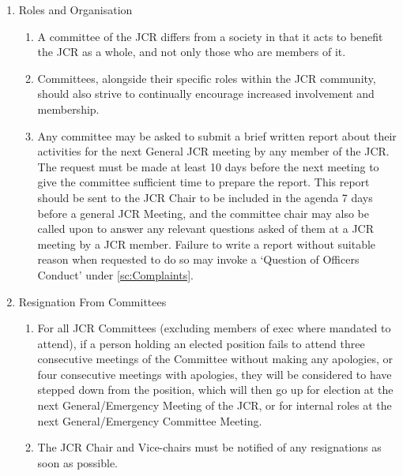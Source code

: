 \begin{enumerate}
    \item Roles and Organisation
    \begin{enumerate}
        \item A committee of the JCR differs from a society in that it acts to benefit the JCR as a whole, and not only those who are members of it.
        \item Committees, alongside their specific roles within the JCR community, should also strive to continually encourage increased involvement and membership.
        \item Any committee may be asked to submit a brief written report about their activities for the next General JCR meeting by any member of the JCR. The request must be made at least 10 days before the next meeting to give the committee sufficient time to prepare the report. This report should be sent to the JCR Chair to be included in the agenda 7 days before a general JCR Meeting, and the committee chair may also be called upon to answer any relevant questions asked of them at a JCR meeting by a JCR member. Failure to write a report without suitable reason when requested to do so may invoke a ‘Question of Officers Conduct’ under \ref{sc:Complaints}.
    \end{enumerate}
    \item Resignation From Committees
    \begin{enumerate}
        \item For all JCR Committees (excluding members of exec where mandated to attend), if a person holding an elected position fails to attend three consecutive meetings of the Committee without making any apologies, or four consecutive meetings with apologies, they will be considered to have stepped down from the position, which will then go up for election at the next General/Emergency Meeting of the JCR, or for internal roles at the next General/Emergency Committee Meeting.
        \item The JCR Chair and Vice-chairs must be notified of any resignations as soon as possible.
    \end{enumerate}
\end{enumerate}

